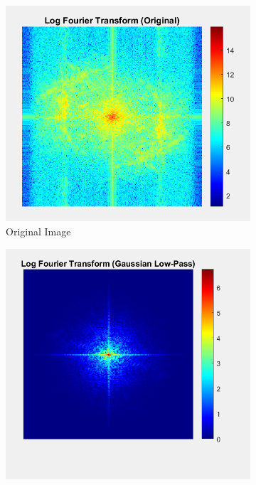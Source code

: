 \documentclass[a4paper]{article}
\begin{document}
\begin{figure}[h]
    \centering
    \begin{subfigure}{0.32\linewidth}
        \centering
        \includegraphics[width=\linewidth]{fo_ori.png}
        \caption{Original Image}
    \end{subfigure}
    \begin{subfigure}{0.32\linewidth}
        \centering
        \includegraphics[width=\linewidth]{40_image_fo.png}

\end{subfigure}
\end{figure}
\end{document}
